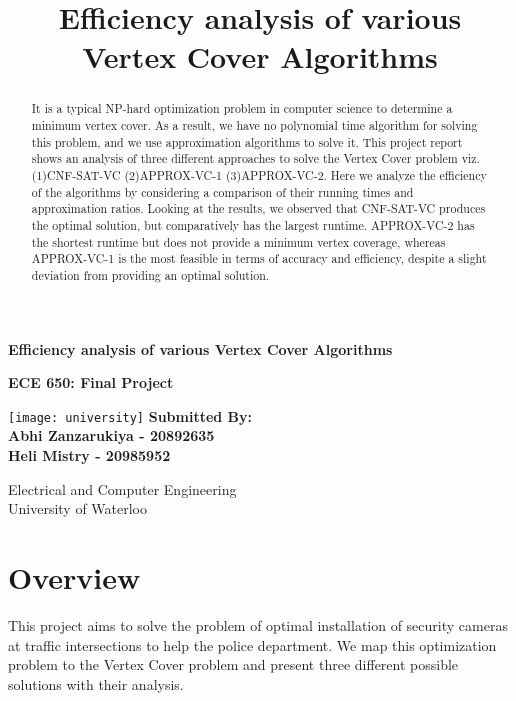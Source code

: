 \documentclass{article}
\title{Efficiency analysis of various Vertex Cover Algorithms}
\begin{document}
\begin{titlepage}
    \begin{center}
        \vspace*{0.5cm}
        \Huge
        \textbf{Efficiency analysis of various Vertex Cover Algorithms }
            
        \vspace{1cm}
        \LARGE
        \bf ECE 650: Final Project     
        \vspace{4.5cm}
         

        \texttt{[image: university]}
        \vfill
        \textbf{Submitted By:\\
        Abhi Zanzarukiya - 20892635 \\
        Heli Mistry - 20985952}
        \vspace{0.8cm}
            
        \Large
        Electrical and Computer Engineering\\
        University of Waterloo\\
    \end{center}
\end{titlepage}
\begin{abstract}
It is a typical NP-hard optimization problem in computer science to determine a minimum vertex cover. As a result, we have no polynomial time algorithm for solving this problem, and we use approximation algorithms to solve it. This project report shows an analysis of three different approaches to solve the Vertex Cover problem viz.(1)CNF-SAT-VC (2)APPROX-VC-1 (3)APPROX-VC-2. Here we analyze the efficiency of the algorithms by considering a comparison of their running times and approximation ratios. Looking at the results, we observed that CNF-SAT-VC produces the optimal solution, but comparatively has the largest runtime. APPROX-VC-2 has the shortest runtime but does not provide a minimum vertex coverage, whereas APPROX-VC-1 is the most feasible in terms of accuracy and efficiency, despite a slight deviation from providing an optimal solution.
\end{abstract}

\section{Overview}

This project aims to solve the problem of optimal installation of security cameras at traffic intersections to help the police department. We map this optimization problem to the Vertex Cover problem and present three different possible solutions with their analysis.
\end{document}
